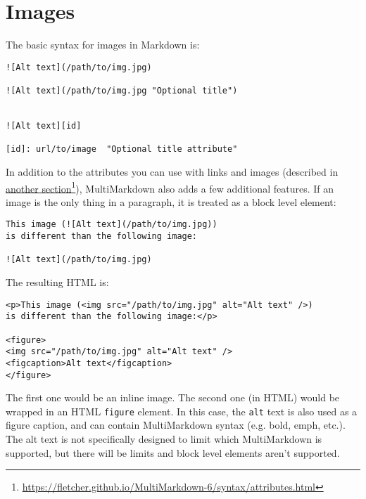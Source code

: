 
\def\mytitle{Images}
\def\myauthor{Fletcher T. Penney}
\def\revised{2018-06-30}




\tableofcontents

\section{Images}
\label{images}

The basic syntax for images in Markdown is:

\begin{verbatim}
![Alt text](/path/to/img.jpg)

![Alt text](/path/to/img.jpg "Optional title")


![Alt text][id]

[id]: url/to/image  "Optional title attribute"
\end{verbatim}

In addition to the attributes you can use with links and images (described in \href{https://fletcher.github.io/MultiMarkdown-6/syntax/attributes.html}{another section}\footnote{\href{https://fletcher.github.io/MultiMarkdown-6/syntax/attributes.html}{https:\slash{}\slash{}fletcher.github.io\slash{}MultiMarkdown-6\slash{}syntax\slash{}attributes.html}}), MultiMarkdown also adds a few additional features. If an image is the only thing in a paragraph, it is treated as a block level element:

\begin{verbatim}
This image (![Alt text](/path/to/img.jpg))
is different than the following image:

![Alt text](/path/to/img.jpg)
\end{verbatim}

The resulting HTML is:

\begin{verbatim}
<p>This image (<img src="/path/to/img.jpg" alt="Alt text" />)
is different than the following image:</p>

<figure>
<img src="/path/to/img.jpg" alt="Alt text" />
<figcaption>Alt text</figcaption>
</figure>
\end{verbatim}

The first one would be an inline image. The second one (in HTML) would be wrapped in an HTML \texttt{figure} element. In this case, the \texttt{alt} text is also used as a figure caption, and can contain MultiMarkdown syntax (e.g. bold, emph, etc.). The alt text is not specifically designed to limit which MultiMarkdown is supported, but there will be limits and block level elements aren't supported.



